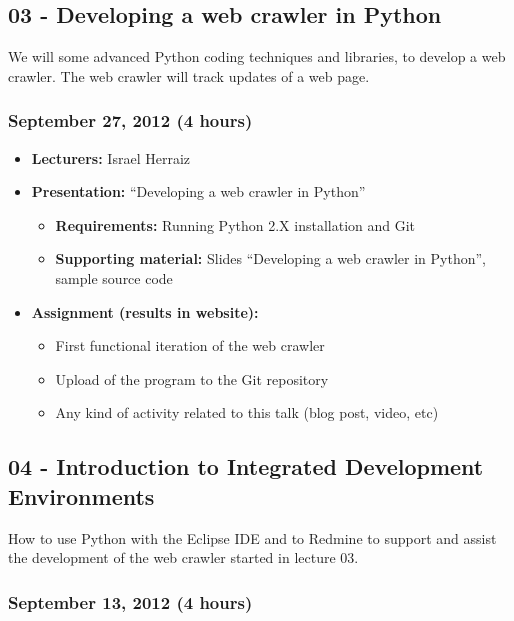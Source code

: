 \documentclass[a4paper]{article}
\begin{document}
\subsection{03 - Developing a web crawler in Python}

We will some advanced Python coding techniques and libraries, to
develop a web crawler. The web crawler  will track updates of a web
page.

\subsubsection{September 27, 2012 (4 hours)}

\begin{itemize}
\item \textbf{Lecturers:} Israel Herraiz
\item \textbf{Presentation:} ``Developing a web crawler in Python''
  \begin{itemize}
  \item \textbf{Requirements:} Running Python 2.X installation and Git
  \item \textbf{Supporting material:} Slides ``Developing a web
    crawler in Python'', sample source code
  \end{itemize}
\item \textbf{Assignment (results in website):} 
  \begin{itemize}
  \item First functional iteration of the web crawler
  \item Upload of the program to the Git repository
  \item Any kind of activity
    related to this talk (blog post, video, etc)
  \end{itemize}
\end{itemize}


\subsection{04 - Introduction to Integrated Development Environments}

How to use Python with the Eclipse IDE and to Redmine to support and
assist the development of the web crawler started in lecture 03.
\subsubsection{September 13, 2012 (4 hours)}
\end{document}
